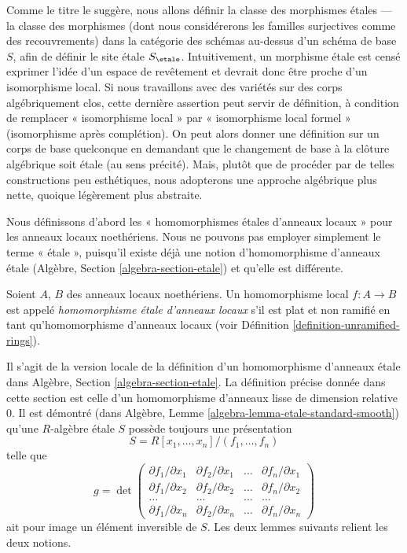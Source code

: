 \medskip\noindent
Comme le titre le suggère, nous allons définir la classe des morphismes \'etales --- la
classe des morphismes (dont nous considérerons les familles surjectives comme des recouvrements)
dans la catégorie des schémas au-dessus d'un schéma de base $S$, afin de définir le
site \'etale $S_\etale$. Intuitivement, un morphisme \'etale est censé
exprimer l'idée d'un espace de revêtement et devrait donc être proche d'un
isomorphisme local. Si nous travaillons avec des variétés sur des corps algébriquement clos,
cette dernière assertion peut servir de définition, à condition de remplacer
« isomorphisme local » par « isomorphisme local formel » (isomorphisme après
complétion). On peut alors donner une définition sur un corps de base quelconque en demandant
que le changement de base à la clôture algébrique soit \'etale (au
sens précité). Mais, plutôt que de procéder par de telles constructions peu
esthétiques, nous adopterons une approche algébrique plus nette, quoique légèrement plus
abstraite.

\medskip\noindent
Nous définissons d'abord les « homomorphismes \'etales d'anneaux locaux » pour les anneaux
locaux noethériens. Nous ne pouvons pas employer simplement le terme « \'etale », puisqu'il
existe déjà une notion d'homomorphisme d'anneaux \'etale
(Algèbre, Section \ref{algebra-section-etale})
et qu'elle est différente.

\begin{definition}
\label{definition-etale-ring}
Soient $A$, $B$ des anneaux locaux noethériens.
Un homomorphisme local $f : A \to B$ est appelé
{\it homomorphisme \'etale d'anneaux locaux}
s'il est plat et non ramifié en tant qu'homomorphisme d'anneaux locaux
(voir Définition \ref{definition-unramified-rings}).
\end{definition}

\noindent
Il s'agit de la version locale de la définition d'un homomorphisme d'anneaux \'etale dans
Algèbre, Section \ref{algebra-section-etale}.
La définition précise
donnée dans cette section est celle d'un homomorphisme d'anneaux lisse de dimension
relative $0$. Il est démontré (dans
Algèbre, Lemme \ref{algebra-lemma-etale-standard-smooth})
qu'une $R$-algèbre \'etale $S$ possède toujours une présentation
$$
S = R[x_1, \ldots, x_n]/(f_1, \ldots, f_n)
$$
telle que
$$
g =
\det
\left(
\begin{matrix}
\partial f_1/\partial x_1 &
\partial f_2/\partial x_1 &
\ldots &
\partial f_n/\partial x_1 \\
\partial f_1/\partial x_2 &
\partial f_2/\partial x_2 &
\ldots &
\partial f_n/\partial x_2 \\
\ldots & \ldots & \ldots & \ldots \\
\partial f_1/\partial x_n &
\partial f_2/\partial x_n &
\ldots &
\partial f_n/\partial x_n
\end{matrix}
\right)
$$
ait pour image un élément inversible de $S$. Les deux lemmes suivants relient les deux
notions.

